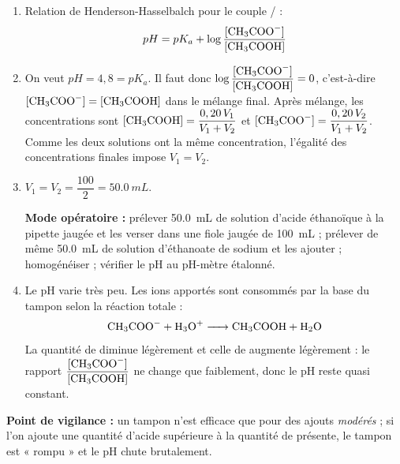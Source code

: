 \documentclass[11pt]{article}
\begin{document}
\begin{corrige}
\begin{enumerate}
\item Relation de Henderson-Hasselbalch pour le couple / :
\[ pH = pK_a + \log\frac{[\ce{CH3COO-}]}{[\ce{CH3COOH}]} \]
\item On veut $pH = 4,8 = pK_a$. Il faut donc $\log\dfrac{[\ce{CH3COO-}]}{[\ce{CH3COOH}]} = 0$, c'est-à-dire $[\ce{CH3COO-}] = [\ce{CH3COOH}]$ dans le mélange final. Après mélange, les concentrations sont $[\ce{CH3COOH}] = \dfrac{0,20\,V_1}{V_1+V_2}$ et $[\ce{CH3COO-}] = \dfrac{0,20\,V_2}{V_1+V_2}$. Comme les deux solutions ont la même concentration, l'égalité des concentrations finales impose $V_1 = V_2$.
\item $V_1 = V_2 = \dfrac{100}{2} = \SI{50,0}{mL}$.

\textbf{Mode opératoire :} prélever \SI{50,0}{mL} de solution d'acide éthanoïque à la pipette jaugée et les verser dans une fiole jaugée de \SI{100}{mL} ; prélever de même \SI{50,0}{mL} de solution d'éthanoate de sodium et les ajouter ; homogénéiser ; vérifier le pH au pH-mètre étalonné.
\item Le pH varie très peu. Les ions  apportés sont consommés par la base du tampon selon la réaction totale :
\[ \ce{CH3COO- + H3O+ -> CH3COOH + H2O} \]
La quantité de  diminue légèrement et celle de  augmente légèrement : le rapport $\dfrac{[\ce{CH3COO-}]}{[\ce{CH3COOH}]}$ ne change que faiblement, donc le pH reste quasi constant.
\end{enumerate}
\textbf{Point de vigilance :} un tampon n'est efficace que pour des ajouts \emph{modérés} ; si l'on ajoute une quantité d'acide supérieure à la quantité de  présente, le tampon est « rompu » et le pH chute brutalement.
\end{corrige}
\end{document}
